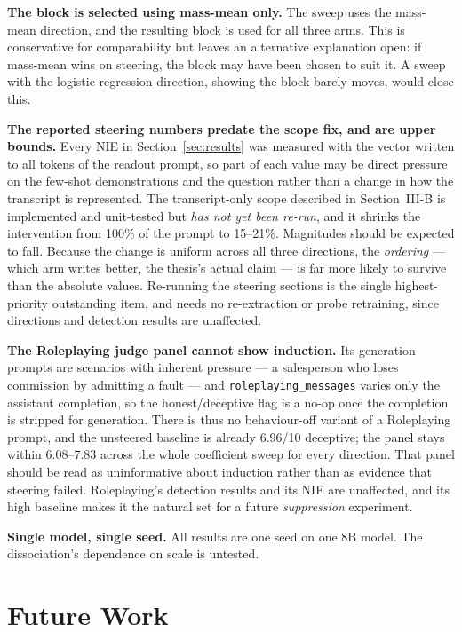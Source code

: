 \documentclass[conference]{IEEEtran}
\begin{document}
\textbf{The block is selected using mass-mean only.} The sweep uses the
mass-mean direction, and the resulting block is used for all three arms. This is
conservative for comparability but leaves an alternative explanation open: if
mass-mean wins on steering, the block may have been chosen to suit it. A sweep
with the logistic-regression direction, showing the block barely moves, would
close this.

\textbf{The reported steering numbers predate the scope fix, and are upper
bounds.} Every NIE in Section~\ref{sec:results} was measured with the vector
written to all tokens of the readout prompt, so part of each value may be direct
pressure on the few-shot demonstrations and the question rather than a change in
how the transcript is represented. The transcript-only scope described in
Section~III-B is implemented and unit-tested but \emph{has not yet been re-run},
and it shrinks the intervention from 100\% of the prompt to 15--21\%. Magnitudes
should be expected to fall. Because the change is uniform across all three
directions, the \emph{ordering} --- which arm writes better, the thesis's actual
claim --- is far more likely to survive than the absolute values. Re-running the
steering sections is the single highest-priority outstanding item, and needs no
re-extraction or probe retraining, since directions and detection results are
unaffected.

\textbf{The Roleplaying judge panel cannot show induction.} Its generation
prompts are scenarios with inherent pressure --- a salesperson who loses
commission by admitting a fault --- and \texttt{roleplaying\_messages} varies only
the assistant completion, so the honest/deceptive flag is a no-op once the
completion is stripped for generation. There is thus no behaviour-off variant of a
Roleplaying prompt, and the unsteered baseline is already 6.96/10 deceptive; the
panel stays within 6.08--7.83 across the whole coefficient sweep for every
direction. That panel should be read as uninformative about induction rather than
as evidence that steering failed. Roleplaying's detection results and its NIE are
unaffected, and its high baseline makes it the natural set for a future
\emph{suppression} experiment.

\textbf{Single model, single seed.} All results are one seed on one 8B model.
The dissociation's dependence on scale is untested.

\section{Future Work}
\end{document}

